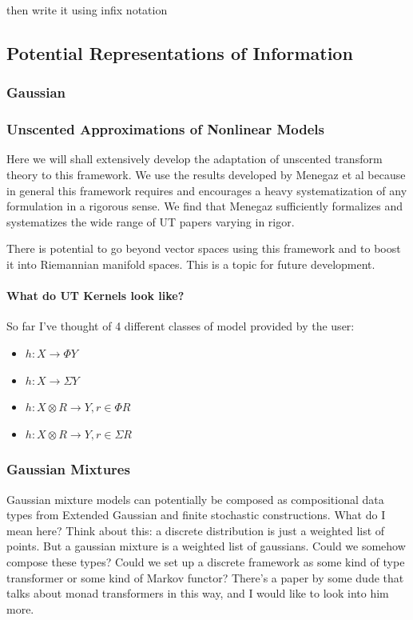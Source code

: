 \documentclass[letterpaper, 10 pt, conference]{ieeeconf}  %
\begin{document}
then write it using infix notation

\subsection{Potential Representations of Information}
\subsubsection{Gaussian}
\subsubsection{Unscented Approximations of Nonlinear Models}

Here we will shall extensively develop the adaptation of unscented transform theory to this framework.
We use the results developed by Menegaz et al because in general this framework requires and encourages a heavy systematization of any formulation in a rigorous sense.
We find that Menegaz sufficiently formalizes and systematizes the wide range of UT papers varying in rigor.

There is potential to go beyond vector spaces using this framework and to boost it into Riemannian manifold spaces.
This is a topic for future development.

\paragraph{What do UT Kernels look like?}

So far I've thought of 4 different classes of model provided by the user:

\begin{itemize}
	\item $h: X \rightarrow \Phi Y$
	\item $h: X \rightarrow \Sigma Y$
	\item $h: X\otimes R \rightarrow Y, r\in \Phi R $
	\item $h: X\otimes R \rightarrow Y, r\in \Sigma R $
\end{itemize}

\subsubsection{Gaussian Mixtures}

Gaussian mixture models can potentially be composed as compositional data types from Extended Gaussian and finite stochastic constructions.
What do I mean here?
Think about this: a discrete distribution is just a weighted list of points. But a gaussian mixture is a weighted list of gaussians.
Could we somehow compose these types? Could we set up a discrete framework as some kind of type transformer or some kind of Markov functor?
There's a paper by some dude that talks about monad transformers in this way, and I would like to look into him more.
\end{document}
